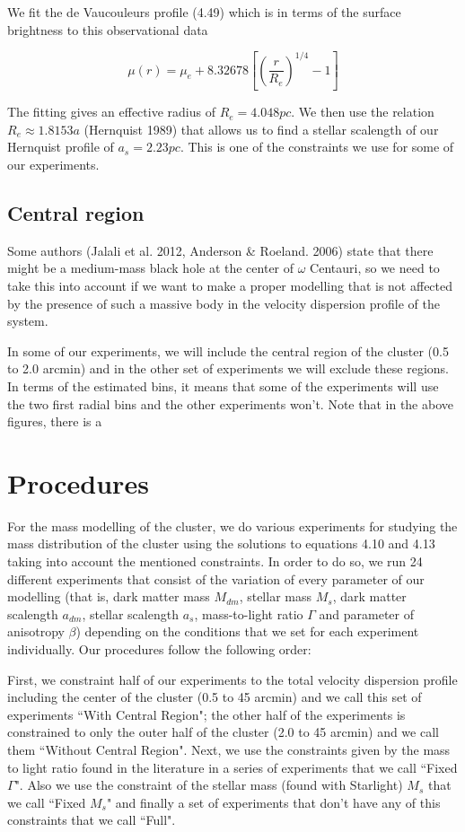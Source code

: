 We fit the de Vaucouleurs profile (4.49) which is in terms of the surface brightness to this observational data 

\begin{equation}
\mu(r)=\mu_{e}+8.32678\left[\left(\frac{r}{R_{e}}\right)^{1/4}-1\right]
\end{equation}

The fitting gives an effective radius of $R_{e}=4.048pc$. We then use the relation $R_{e}\approx1.8153a$ (Hernquist 1989) that allows us to find a stellar scalength of our Hernquist profile of $a_{s}=2.23pc$. This is one of the constraints we use for some of our experiments.

\subsection{Central region}

Some authors (Jalali et al. 2012, Anderson \& Roeland. 2006) state that there might be a medium-mass black hole at the center of $\omega$ Centauri, so we need to take this into account if we want to make a proper modelling that is not affected by the presence of such a massive body in the velocity dispersion profile of the system.

In some of our experiments, we will include the central region of the cluster (0.5 to 2.0 arcmin) and in the other set of experiments we will exclude these regions. In terms of the estimated bins, it means that some of the experiments will use the two first radial bins and the other experiments won't. 
Note that in the above figures, there is a 
\section{Procedures}

For the mass modelling of the cluster, we do various experiments for studying the mass distribution of the cluster using the solutions to equations 4.10 and 4.13 taking into account the mentioned constraints. In order to do so, we run 24 different experiments that consist of the variation of every parameter of our modelling (that is, dark matter mass $M_{dm}$, stellar mass $M_{s}$, dark matter scalength $a_{dm}$, stellar scalength $a_{s}$, mass-to-light ratio $\Gamma$ and parameter of anisotropy $\beta$) depending on the conditions that we set for each experiment individually. Our procedures follow the following order:

First, we constraint half of our experiments to the total velocity dispersion profile including the center of the cluster (0.5 to 45 arcmin) and we call this set of experiments ``With Central Region"; the other half of the experiments is constrained to only the outer half of the cluster (2.0 to 45 arcmin) and we call them ``Without Central Region". Next, we use the constraints given by the mass to light ratio found in the literature in a series of experiments that we call ``Fixed $\Gamma$". Also we use the constraint of the stellar mass (found with Starlight) $M_s$ that we call ``Fixed $M_s$" and finally a set of experiments that don't have any of this constraints that we call ``Full".

